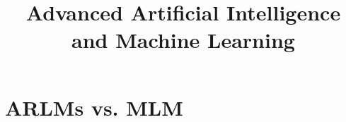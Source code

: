 




\usepackage{animate}
\newcommand{\citebutton}[2]{\beamergotobutton{\href{#2}{#1}}}
\newcommand{\ques}{\textbf{\textcolor{red}{Question:  }}}
\def\myblue#1{\textcolor{texblue}{#1}}
\newcommand{\blu}[1]{\textcolor{blue}{#1}}
\newcommand{\org}[1]{\textcolor{orange}{#1}}
\long{}
\newcommand\warning{%
 \makebox[1.4em][c]{%
 \makebox[0pt][c]{\raisebox{.1em}{\scriptsize!}}%
 \makebox[0pt][c]{\color{red}\normalsize$\bigtriangleup$}}}%

\newcommand{\titlefigure}{figure/bert-input.png}
\newcommand{\learninggoals}{
  \item Autoregressive vs.\ masked language modeling, and how to measure LM performance
  \item BERT: architecture, pre-training (MLM, NSP), and fine-tuning
  \item Transfer learning and self-supervision
  \item BERTology and the BERT-based family: RoBERTa, ALBERT, DistilBERT
  \item Post-BERT objectives (ELECTRA, XLNet) and T5's text-to-text framing
}

\title{Advanced Artificial Intelligence and Machine Learning}
\date{}




\section{ARLMs vs. MLM}

